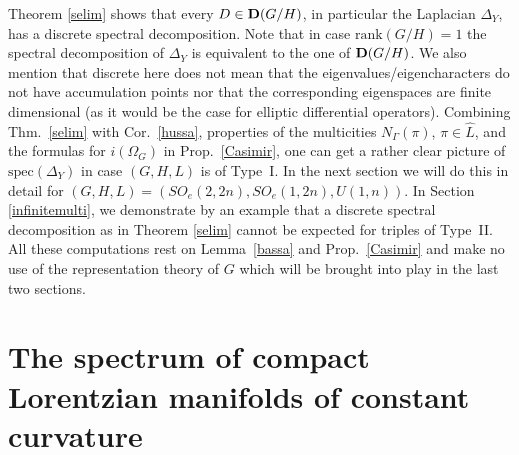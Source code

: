 \documentclass[10]{amsart}
\theoremstyle{remark}
\theoremstyle{definition}
\numberwithin{equation}{section}
\newcommand{\rank}{\text{rank}}
\newcommand{\spec}{{\mathrm{spec}}}
\begin{document}
{Theorem \ref{selim} shows that every $D\in {\bf D}(G/H)$, in particular the Laplacian $\Delta_Y$,  has a discrete spectral decomposition. Note that in case $\rank(G/H)=1$ the spectral decomposition of $\Delta_Y$ is equivalent to the one of ${\bf D}(G/H)$. We also mention that discrete here does not mean that the eigenvalues/eigencharacters do not have accumulation points nor that the corresponding eigenspaces are finite dimensional (as it would be the case for elliptic
differential operators). Combining Thm.~\ref{selim} with Cor.~\ref{hussa}, properties of the multicities $N_\Gamma(\pi)$, $\pi\in \widehat L$, and the formulas for $i(\Omega_G)$ in Prop.~\ref{Casimir}, one can get a rather clear picture of $\spec(\Delta_Y)$ in case $(G,H,L)$ is of Type~I. In the next section we will do this in detail for $(G,H,L)=(SO_{e}(2,2n),SO_{e}(1,2n),U(1,n))$. In Section \ref{infinitemulti}, we demonstrate by an example that a discrete spectral decomposition as in Theorem \ref{selim} cannot be expected for triples of Type~II. All these computations rest on Lemma~\ref{bassa} and Prop.~\ref{Casimir} and make no use of the representation theory of $G$ which will be brought into play in the last two sections. 

\section{The spectrum of compact Lorentzian manifolds of constant curvature}\label{detail}

}
\end{document}
